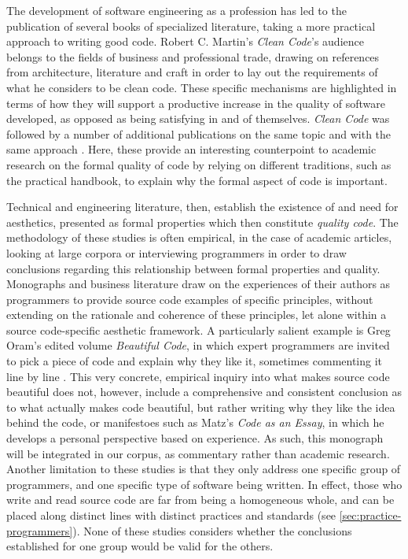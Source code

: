 The development of software engineering as a profession has led to the publication of several books of specialized literature, taking a more practical approach to writing good code. Robert C. Martin's \emph{Clean Code}'s audience belongs to the fields of business and professional trade, drawing on references from architecture, literature and craft in order to lay out the requirements of what he considers to be clean code. These specific mechanisms are highlighted in terms of how they will support a productive increase in the quality of software developed, as opposed as being satisfying in and of themselves. \emph{Clean Code} was followed by a number of additional publications on the same topic and with the same approach \citep{fowler_refactoring_1999,arns_code_2005,hunt_pragmatic_1999}. Here, these provide an interesting counterpoint to academic research on the formal quality of code by relying on different traditions, such as the practical handbook, to explain why the formal aspect of code is important.

Technical and engineering literature, then, establish the existence of and need for aesthetics, presented as formal properties which then constitute \emph{quality code}. The methodology of these studies is often empirical, in the case of academic articles, looking at large corpora or interviewing programmers in order to draw conclusions regarding this relationship between formal properties and quality. Monographs and business literature draw on the experiences of their authors as programmers to provide source code examples of specific principles, without extending on the rationale and coherence of these principles, let alone within a source code-specific aesthetic framework. A particularly salient example is Greg Oram's edited volume \emph{Beautiful Code}, in which expert programmers are invited to pick a piece of code and explain why they like it, sometimes commenting it line by line \citep{oram_beautiful_2007}. This very concrete, empirical inquiry into what makes source code beautiful does not, however, include a comprehensive and consistent conclusion as to what actually makes code beautiful, but rather writing why they like the idea behind the code, or manifestoes such as Matz's \emph{Code as an Essay}, in which he develops a personal perspective based on experience. As such, this monograph will be integrated in our corpus, as commentary rather than academic research. Another limitation to these studies is that they only address one specific group of programmers, and one specific type of software being written. In effect, those who write and read source code are far from being a homogeneous whole, and can be placed along distinct lines with distinct practices and standards \citep{hayes_cultures_2015} (see \autoref{sec:practice-programmers}). None of these studies considers whether the conclusions established for one group would be valid for the others.

